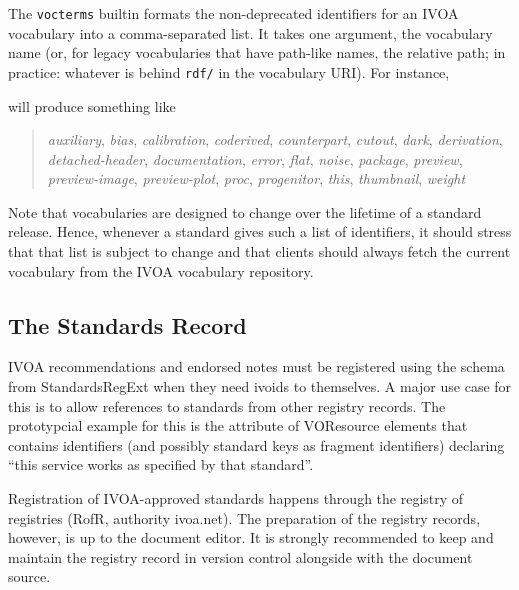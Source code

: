 \documentclass[11pt,a4paper]{ivoa}
\begin{document}
The \texttt{vocterms} builtin formats the non-deprecated identifiers for
an IVOA vocabulary \citep{2023ivoa.spec.0206D} into a comma-separated
list.  It takes one argument, the vocabulary name (or, for legacy
vocabularies that have path-like names, the relative path; in practice:
whatever is behind \texttt{rdf/} in the vocabulary URI).  For instance,



will produce something like

\begin{quotation}
\noindent
\textsl{auxiliary},
\textsl{bias},
\textsl{calibration},
\textsl{coderived},
\textsl{counterpart},
\textsl{cutout},
\textsl{dark},
\textsl{derivation},
\textsl{detached-header},
\textsl{documentation},
\textsl{error},
\textsl{flat},
\textsl{noise},
\textsl{package},
\textsl{preview},
\textsl{preview-image},
\textsl{preview-plot},
\textsl{proc},
\textsl{progenitor},
\textsl{this},
\textsl{thumbnail},
\textsl{weight}
\end{quotation}

Note that vocabularies are designed to change over the lifetime of a
standard release.  Hence, whenever a standard gives such a
list of identifiers, it should stress that that list is subject to
change and that clients should always fetch the current vocabulary from
the IVOA vocabulary repository.

\subsection{The Standards Record}
\label{sect:stdrec}

IVOA recommendations and endorsed notes must be registered using the
schema from StandardsRegExt \citep{2012ivoa.spec.0508H} when they need
ivoids to themselves.  A major use
case for this is to allow references to standards from other registry
records. The prototypcial example for this is the 
attribute of VOResource  elements that contains
identifiers (and possibly standard keys as fragment identifiers)
declaring ``this service works as specified by that standard''.

Registration of IVOA-approved standards happens through the registry of
registries (RofR, authority ivoa.net).  The preparation of the registry
records, however, is up to the document editor.  It is strongly
recommended to keep and maintain the registry record in version control
alongside with the document source.
\end{document}
